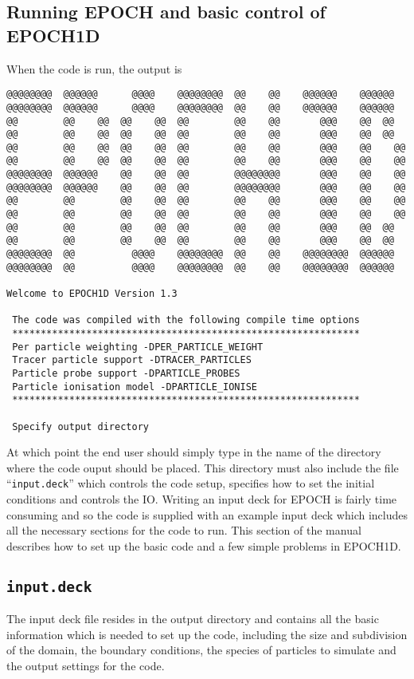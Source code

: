 \documentclass[12pt]{article}
\newcommand{\boxverbatim}[1]{\begin{Verbatim}[obeytabs=true,frame=single,
  framerule=0.5mm,rulecolor=\color{warwickmid},label=#1]}
\newcommand{\code}[1]{{\texttt{#1}}}
\newcommand{\qtt}[1]{``{\code{#1}}''}
\newcommand{\nEPOCH}{{\color{warwickdark}\fontfamily{phv}\selectfont EPOCH}}
\newcommand{\EPOCH}{{\nEPOCH} }
\begin{document}
\subsection{Running \EPOCH and basic control of EPOCH1D}
When the code is run, the output is\\
\boxverbatim{Command line output}
@@@@@@@@  @@@@@@      @@@@    @@@@@@@@  @@    @@    @@@@@@    @@@@@@
@@@@@@@@  @@@@@@      @@@@    @@@@@@@@  @@    @@    @@@@@@    @@@@@@
@@        @@    @@  @@    @@  @@        @@    @@       @@@    @@  @@
@@        @@    @@  @@    @@  @@        @@    @@       @@@    @@  @@
@@        @@    @@  @@    @@  @@        @@    @@       @@@    @@    @@
@@        @@    @@  @@    @@  @@        @@    @@       @@@    @@    @@
@@@@@@@@  @@@@@@    @@    @@  @@        @@@@@@@@       @@@    @@    @@
@@@@@@@@  @@@@@@    @@    @@  @@        @@@@@@@@       @@@    @@    @@
@@        @@        @@    @@  @@        @@    @@       @@@    @@    @@
@@        @@        @@    @@  @@        @@    @@       @@@    @@    @@
@@        @@        @@    @@  @@        @@    @@       @@@    @@  @@
@@        @@        @@    @@  @@        @@    @@       @@@    @@  @@
@@@@@@@@  @@          @@@@    @@@@@@@@  @@    @@    @@@@@@@@  @@@@@@
@@@@@@@@  @@          @@@@    @@@@@@@@  @@    @@    @@@@@@@@  @@@@@@

Welcome to EPOCH1D Version 1.3

 The code was compiled with the following compile time options
 *************************************************************
 Per particle weighting -DPER_PARTICLE_WEIGHT
 Tracer particle support -DTRACER_PARTICLES
 Particle probe support -DPARTICLE_PROBES
 Particle ionisation model -DPARTICLE_IONISE
 *************************************************************

 Specify output directory
\end{Verbatim}

At which point the end user should simply type in the name of the directory
where the code ouput should be placed. This directory must also include the
file \qtt{input.deck} which controls the code setup, specifies how to set the
initial conditions and controls the IO. Writing an input deck for \EPOCH is
fairly time consuming and so the code is supplied with an example input deck
which includes all the necessary sections for the code to run. This section of
the manual describes how to set up the basic code and a few simple problems in
EPOCH1D.

\subsection{\code{input.deck}}
The input deck file resides in the output directory and contains all the basic
information which is needed to set up the code, including the size and
subdivision of the domain, the boundary conditions, the species of particles to
simulate and the output settings for the code.
\end{document}
